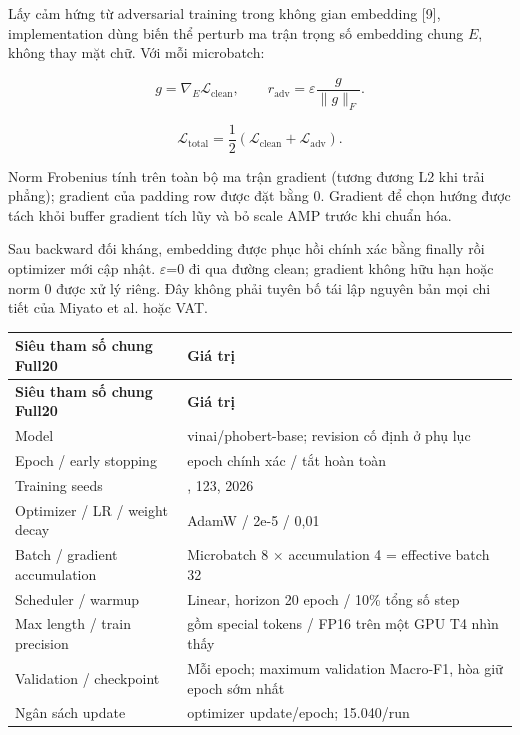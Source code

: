 \documentclass[11pt,a4paper]{article}
\newlength{\reporttablewidth}
\begin{document}
Lấy cảm hứng từ adversarial training trong không gian embedding [9], implementation dùng biến thể perturb ma trận trọng số embedding chung $E$, không thay mặt chữ. Với mỗi microbatch:


\[
g = \nabla_E \mathcal{L}_{\mathrm{clean}}, \qquad
r_{\mathrm{adv}} = \varepsilon \frac{g}{\lVert g \rVert_F}.
\]

\[
\mathcal{L}_{\mathrm{total}} = \frac{1}{2}\left(\mathcal{L}_{\mathrm{clean}} + \mathcal{L}_{\mathrm{adv}}\right).
\]

Norm Frobenius tính trên toàn bộ ma trận gradient (tương đương L2 khi trải phẳng); gradient của padding row được đặt bằng 0. Gradient để chọn hướng được tách khỏi buffer gradient tích lũy và bỏ scale AMP trước khi chuẩn hóa.


Sau backward đối kháng, embedding được phục hồi chính xác bằng finally rồi optimizer mới cập nhật. \ensuremath{\varepsilon}=0 đi qua đường clean; gradient không hữu hạn hoặc norm 0 được xử lý riêng. Đây không phải tuyên bố tái lập nguyên bản mọi chi tiết của Miyato et al. hoặc VAT.


\begingroup
\small
\setlength{\tabcolsep}{4pt}
\setlength{\reporttablewidth}{\dimexpr\linewidth-2\tabcolsep\relax}
\renewcommand{\arraystretch}{1.15}
\begin{longtable}{@{}>{\raggedright\arraybackslash}p{0.31000\reporttablewidth}>{\raggedright\arraybackslash}p{0.69000\reporttablewidth}@{}}
\toprule
\textbf{Siêu tham số chung Full20} & \textbf{Giá trị} \\
\midrule
\endfirsthead
\toprule
\textbf{Siêu tham số chung Full20} & \textbf{Giá trị} \\
\midrule
\endhead
\bottomrule
\endlastfoot
Model & vinai/phobert-base; revision cố định ở phụ lục \\
Epoch / early stopping & 20 epoch chính xác / tắt hoàn toàn \\
Training seeds & 42, 123, 2026 \\
Optimizer / LR / weight decay & AdamW / 2e-5 / 0,01 \\
Batch / gradient accumulation & Microbatch 8 \ensuremath{\times} accumulation 4 = effective batch 32 \\
Scheduler / warmup & Linear, horizon 20 epoch / 10\% tổng số step \\
Max length / train precision & 256 gồm special tokens / FP16 trên một GPU T4 nhìn thấy \\
Validation / checkpoint & Mỗi epoch; maximum validation Macro-F1, hòa giữ epoch sớm nhất \\
Ngân sách update & 752 optimizer update/epoch; 15.040/run \\
\end{longtable}
\endgroup
\end{document}
